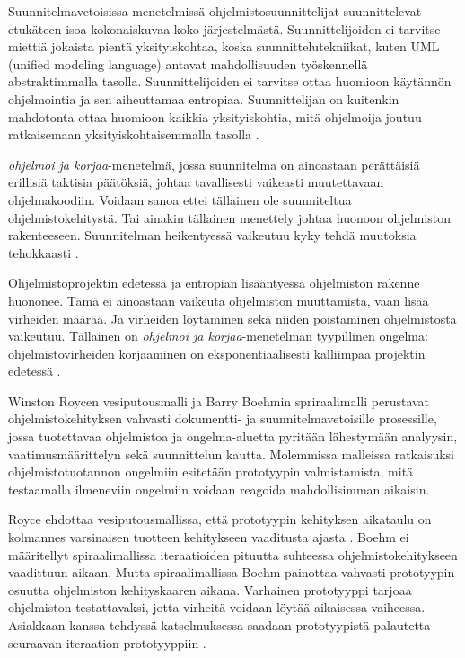 \documentclass[finnish]{tktltiki2}
\theoremstyle{definition}
\theoremstyle{remark}
\begin{document}
Suunnitelmavetoisissa menetelmissä ohjelmistosuunnittelijat suunnittelevat etukäteen isoa kokonaiskuvaa koko järjestelmästä. Suunnittelijoiden ei tarvitse miettiä jokaista pientä yksityiskohtaa, koska suunnittelutekniikat, kuten UML (unified modeling language) antavat mahdollisuuden työskennellä abstraktimmalla tasolla. Suunnittelijoiden ei tarvitse ottaa huomioon käytännön ohjelmointia ja sen aiheuttamaa entropiaa. Suunnittelijan on kuitenkin mahdotonta ottaa huomioon kaikkia yksityiskohtia, mitä ohjelmoija joutuu ratkaisemaan yksityiskohtaisemmalla tasolla \cite{FOW01b}.

\textit{ohjelmoi ja korjaa}-menetelmä, jossa suunnitelma on ainoastaan perättäisiä erillisiä taktisia päätöksiä, johtaa tavallisesti vaikeasti muutettavaan ohjelmakoodiin. Voidaan sanoa ettei tällainen ole suunniteltua ohjelmistokehitystä. Tai ainakin tällainen menettely johtaa huonoon ohjelmiston rakenteeseen. Suunnitelman heikentyessä vaikeutuu kyky tehdä muutoksia tehokkaasti \cite{FOW01b}. 

Ohjelmistoprojektin edetessä ja entropian lisääntyessä ohjelmiston rakenne huononee. Tämä ei ainoastaan vaikeuta ohjelmiston muuttamista, vaan lisää virheiden määrää. Ja virheiden löytäminen sekä niiden poistaminen ohjelmistosta vaikeutuu. Tällainen on \textit{ohjelmoi ja korjaa}-menetelmän tyypillinen ongelma: ohjelmistovirheiden korjaaminen on eksponentiaalisesti kalliimpaa projektin edetessä \cite{FOW01b}.

Winston Roycen vesiputousmalli \cite{ROY70} ja Barry Boehmin spriraalimalli \cite{BOE88} perustavat ohjelmistokehityksen vahvasti dokumentti- ja suunnitelmavetoisille prosessille, jossa tuotettavaa ohjelmistoa ja ongelma-aluetta pyritään lähestymään analyysin, vaatimusmäärittelyn sekä suunnittelun kautta. Molemmissa malleissa ratkaisuksi ohjelmistotuotannon ongelmiin esitetään prototyypin valmistamista, mitä testaamalla ilmeneviin ongelmiin voidaan reagoida mahdollisimman aikaisin.

Royce ehdottaa vesiputousmallissa, että prototyypin kehityksen aikataulu on kolmannes varsinaisen tuotteen kehitykseen vaaditusta ajasta \cite{ROY70}. Boehm ei määritellyt spiraalimallissa iteraatioiden pituutta suhteessa ohjelmistokehitykseen vaadittuun aikaan. Mutta spiraalimallissa Boehm painottaa vahvasti prototyypin osuutta ohjelmiston kehityskaaren aikana. Varhainen prototyyppi tarjoaa ohjelmiston testattavaksi, jotta virheitä voidaan löytää aikaisessa vaiheessa. Asiakkaan kanssa tehdyssä katselmuksessa saadaan prototyypistä palautetta seuraavan iteraation prototyyppiin \cite{BOE88}.
\end{document}
